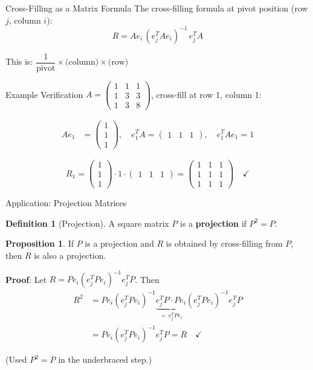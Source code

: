 \documentclass[10pt]{beamer}
\theoremstyle{definition}
\newtheorem{defi}{Definition}[section]
\newtheorem{prop}{Proposition}[section]
\newcommand{\x}[1]{\alert{\textbf{#1}}}
\begin{document}
\begin{frame}[fragile]{Cross-Filling as a Matrix Formula}
The cross-filling formula at pivot position (row $j$, column $i$):
$$\boxed{R = A e_i \, (e_j^T A e_i)^{-1} \, e_j^T A}$$

This is: $\dfrac{1}{\text{pivot}} \times \text{(column)} \times \text{(row)}$
\end{frame}

\begin{frame}{Example Verification}
$A = \begin{pmatrix} 1 & 1 & 1 \\ 1 & 3 & 3 \\ 1 & 3 & 8 \end{pmatrix}$, \quad cross-fill at row 1, column 1:

\vfill
\begin{align*}
Ae_1 &= \begin{pmatrix} 1 \\ 1 \\ 1 \end{pmatrix}, \quad
e_1^T A = \begin{pmatrix} 1 & 1 & 1 \end{pmatrix}, \quad
e_1^T A e_1 = 1
\end{align*}

$$R_1 = \begin{pmatrix} 1 \\ 1 \\ 1 \end{pmatrix} \cdot 1 \cdot \begin{pmatrix} 1 & 1 & 1 \end{pmatrix}
= \begin{pmatrix}
1 & 1 & 1 \\
1 & 1 & 1 \\
1 & 1 & 1
\end{pmatrix} \quad \checkmark$$
\end{frame}

\begin{frame}{Application: Projection Matrices}
\begin{defi}[Projection]
A square matrix $P$ is a \x{projection} if $P^2 = P$.
\end{defi}

\vfill
\begin{prop}
If $P$ is a projection and $R$ is obtained by cross-filling from $P$, then $R$ is also a projection.
\end{prop}

\vfill
\textbf{Proof}: Let $R = Pe_i(e_j^TPe_i)^{-1}e_j^TP$. Then
\begin{align*}
R^2 &= Pe_i(e_j^TPe_i)^{-1} \underbrace{e_j^T P \cdot P e_i}_{= \, e_j^TPe_i} (e_j^TPe_i)^{-1}e_j^TP \\
&= Pe_i(e_j^TPe_i)^{-1}e_j^TP = R \quad \checkmark
\end{align*}

(Used $P^2 = P$ in the underbraced step.)
\end{frame}
\end{document}

